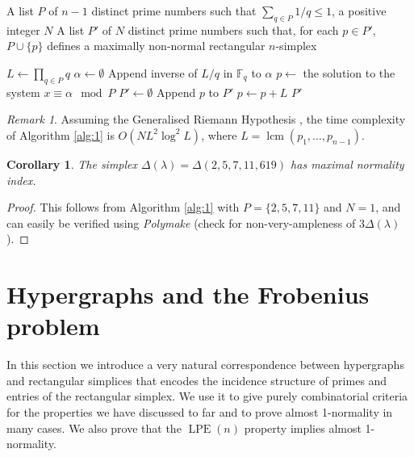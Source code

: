\documentclass[a4paper,11pt]{amsart}
\theoremstyle{plain}
\newtheorem{corollary}[theorem]{Corollary}
\theoremstyle{definition}
\theoremstyle{remark}
\newtheorem{remark}[theorem]{Remark}
\DeclareMathOperator{\lcm}{lcm}
\DeclareMathOperator{\LPE}{LPE}
\begin{document}
\begin{algorithm}
\caption{Find Primes Defining Maximally Non-Normal Rectangular Simplices}\label{alg:1}
\begin{algorithmic}[1]
\Require A list $P$ of $n - 1$ distinct prime numbers such that $\sum_{q \in P} 1/q \leq 1$, a positive integer $N$
\Ensure A list $P'$ of $N$ distinct prime numbers such that, for each $p \in P'$, $P \cup \{p\}$ defines a maximally non-normal rectangular $n$-simplex

\State $L \gets \prod_{q \in P}q$
\State $\alpha \gets \emptyset$
    \State Append inverse of $L/q$ in $\mathbb{F}_q$ to $\alpha$
\EndFor
\State $p \gets$ the solution to the system $x \equiv \alpha \mod P$
\State $P' \gets \emptyset$
        \State Append $p$ to $P'$
    \EndIf
    \State $p \gets p + L$
\EndWhile
\State \Return $P'$
\end{algorithmic}
\end{algorithm}

\begin{remark}
    Assuming the Generalised Riemann Hypothesis \cite{Tao:2015}, the time complexity of Algorithm \ref{alg:1} is $O(NL^2\log^2L)$, where $L = \lcm(p_1, \ldots, p_{n - 1})$.
\end{remark}

\begin{corollary}\label{corollary:2-5-7-11-619}
    The simplex $\Delta(\lambda) = \Delta(2, 5, 7, 11, 619)$ has maximal normality index.
\end{corollary}

\begin{proof}
    This follows from Algorithm \ref{alg:1} with $P = \{2, 5, 7, 11\}$ and $N = 1$, and can easily be verified using \emph{Polymake} (check for non-very-ampleness of $3\Delta(\lambda)$). 
\end{proof}

\section{Hypergraphs and the Frobenius problem}\label{section:hypergraphs}

In this section we introduce a very natural correspondence between hypergraphs and rectangular simplices that encodes the incidence structure of primes and entries of the rectangular simplex. We use it to give purely combinatorial criteria for the properties we have discussed to far and to prove almost 1-normality in many cases. We also prove that the $\LPE(n)$ property implies almost 1-normality.
\end{document}

